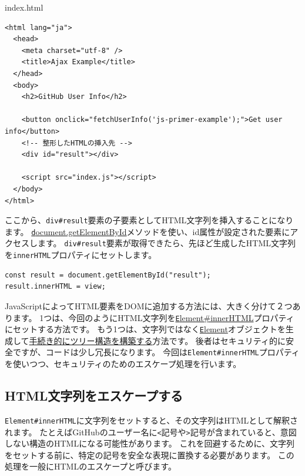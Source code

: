 \begin{listtitle}
index.html
\end{listtitle}
\begin{lstlisting}
<html lang="ja">
  <head>
    <meta charset="utf-8" />
    <title>Ajax Example</title>
  </head>
  <body>
    <h2>GitHub User Info</h2>

    <button onclick="fetchUserInfo('js-primer-example');">Get user info</button>
    <!-- 整形したHTMLの挿入先 -->
    <div id="result"></div>

    <script src="index.js"></script>
  </body>
</html>
\end{lstlisting}
\listend

ここから、\texttt{div\#result}要素の子要素としてHTML文字列を挿入することになります。
\href{https://developer.mozilla.org/ja/docs/Web/API/Document/getElementById}{\texttt document.getElementById}メソッドを使い、id属性が設定された要素にアクセスします。
\texttt{div\#result}要素が取得できたら、先ほど生成したHTML文字列を\texttt{innerHTML}プロパティにセットします。

\begin{lstlisting}
const result = document.getElementById("result");
result.innerHTML = view;
\end{lstlisting}

JavaScriptによってHTML要素をDOMに追加する方法には、大きく分けて２つあります。
1つは、今回のようにHTML文字列を\href{https://developer.mozilla.org/ja/docs/Web/API/Element/innerHTML}{\texttt Element\#innerHTML}プロパティにセットする方法です。
もう1つは、文字列ではなく\href{https://developer.mozilla.org/ja/docs/Web/API/Element}{\texttt Element}オブジェクトを生成して\href{https://developer.mozilla.org/ja/docs/Web/API/Node/appendChild}{手続き的にツリー構造を構築する}方法です。
後者はセキュリティ的に安全ですが、コードは少し冗長になります。
今回は\texttt{Element\#innerHTML}プロパティを使いつつ、セキュリティのためのエスケープ処理を行います。

\hypertarget{escape-html}{%
\subsection{HTML文字列をエスケープする}\label{escape-html}}

\texttt{Element\#innerHTML}に文字列をセットすると、その文字列はHTMLとして解釈されます。
たとえばGitHubのユーザー名に\texttt{<}記号や\texttt{>}記号が含まれていると、意図しない構造のHTMLになる可能性があります。
これを回避するために、文字列をセットする前に、特定の記号を安全な表現に置換する必要があります。
この処理を一般にHTMLのエスケープと呼びます。

